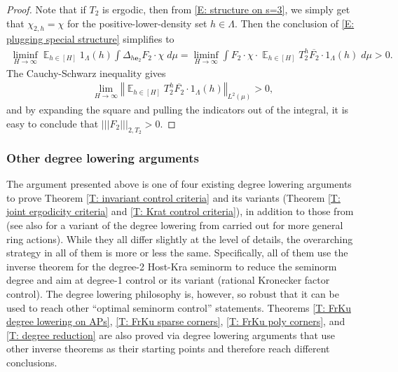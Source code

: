 \documentclass[11pt]{amsart}
\theoremstyle{definition}
\DeclareMathOperator*{\E}{\mathbb{E}}
\newcommand{\be}{{\mathbf{e}}}
\newcommand{\norm}[1]{\left\Vert #1\right\Vert}
\newcommand{\nnorm}[1]{\lvert\!|\!| #1|\!|\!\rvert}
\newcommand{\1}{{\mathbf{1}}}
\newcommand{\abs}[1]{\mathopen{}\left| #1\mathclose{}\right|}
\begin{document}
\begin{proof}
    Note that if $T_2$ is ergodic, then from \eqref{E: structure on s=3}, we simply get that $\chi_{2,h} = \chi$ for the positive-lower-density set $h\in\Lambda$. Then the conclusion of \eqref{E: plugging special structure} simplifies to
    \begin{align*}
        \liminf_{H\to\infty} \E_{h\in[H]}1_\Lambda(h)\int \Delta_{h\be_2} F_2\cdot \chi\; d\mu %
        = \liminf_{H\to\infty} \int F_2\cdot \chi \cdot \E_{h\in[H]} T_2^h \overline{F_2}\cdot 1_\Lambda(h)\; d\mu > 0.
    \end{align*}
    The Cauchy-Schwarz inequality gives 
    \begin{align*}
        \lim_{H\to\infty}\norm{\E_{h\in[H]}T_2^h \overline{F_2}\cdot 1_\Lambda(h)}_{L^2(\mu)}>0,
    \end{align*}
    and by expanding the square and pulling the indicators out of the integral, it is easy to conclude that $\nnorm{F_2}_{2, T_2}>0$.
\end{proof}

\subsubsection{Other degree lowering arguments}
The argument presented above is one of four existing degree lowering arguments to prove Theorem \ref{T: invariant control criteria} and its variants (Theorem \ref{T: joint ergodicity criteria} and \ref{T: Krat control criteria}), in addition to those from \cite{Fr21, FrKu22c, FrKu22a} (see also \cite{BFM22} for a variant of the degree lowering from \cite{Fr21} carried out for more general ring actions). While they all differ slightly at the level of details, the overarching strategy in all of them is more or less the same. Specifically, all of them use the inverse theorem for the degree-2 Host-Kra seminorm to reduce the seminorm degree and aim at degree-1 control or its variant (rational Kronecker factor control). The degree lowering philosophy is, however, so robust that it can be used to reach other ``optimal seminorm control'' statements. Theorems \ref{T: FrKu degree lowering on APs}, \ref{T: FrKu sparse corners}, \ref{T: FrKu poly corners}, and \ref{T: degree reduction} are also proved via degree lowering arguments that use other inverse theorems as their starting points and therefore reach different conclusions. 
\end{document}
